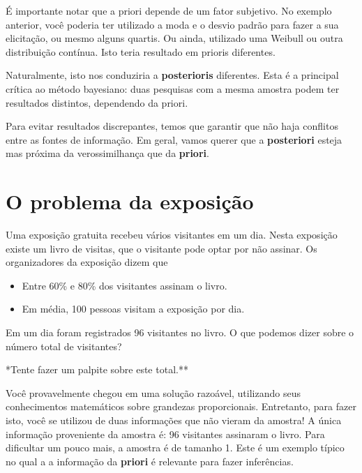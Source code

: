 \documentclass[
  letterpaper,
  DIV=11,
  numbers=noendperiod]{scrreprt}
\providecommand{\tightlist}{%
  \setlength{\itemsep}{0pt}\setlength{\parskip}{0pt}}\usepackage{longtable,booktabs,array}
\theoremstyle{definition}
\theoremstyle{definition}
\theoremstyle{remark}
\begin{document}
É importante notar que a priori depende de um fator subjetivo. No
exemplo anterior, você poderia ter utilizado a moda e o desvio padrão
para fazer a sua elicitação, ou mesmo alguns quartis. Ou ainda,
utilizado uma Weibull ou outra distribuição contínua. Isto teria
resultado em prioris diferentes.

Naturalmente, isto nos conduziria a \textbf{posterioris} diferentes.
Esta é a principal crítica ao método bayesiano: duas pesquisas com a
mesma amostra podem ter resultados distintos, dependendo da priori.

Para evitar resultados discrepantes, temos que garantir que não haja
conflitos entre as fontes de informação. Em geral, vamos querer que a
\textbf{posteriori} esteja mas próxima da verossimilhança que da
\textbf{priori}.

\hypertarget{o-problema-da-exposiuxe7uxe3o}{%
\section{O problema da exposição}\label{o-problema-da-exposiuxe7uxe3o}}

Uma exposição gratuita recebeu vários visitantes em um dia. Nesta
exposição existe um livro de visitas, que o visitante pode optar por não
assinar. Os organizadores da exposição dizem que

\begin{itemize}
\tightlist
\item
  Entre 60\% e 80\% dos visitantes assinam o livro.
\item
  Em média, 100 pessoas visitam a exposição por dia.
\end{itemize}

Em um dia foram registrados 96 visitantes no livro. O que podemos dizer
sobre o número total de visitantes?

*Tente fazer um palpite sobre este total.**

Você provavelmente chegou em uma solução razoável, utilizando seus
conhecimentos matemáticos sobre grandezas proporcionais. Entretanto,
para fazer isto, você se utilizou de duas informações que não vieram da
amostra! A única informação proveniente da amostra é: 96 visitantes
assinaram o livro. Para dificultar um pouco mais, a amostra é de tamanho
1. Este é um exemplo típico no qual a a informação da \textbf{priori} é
relevante para fazer inferências.
\end{document}
